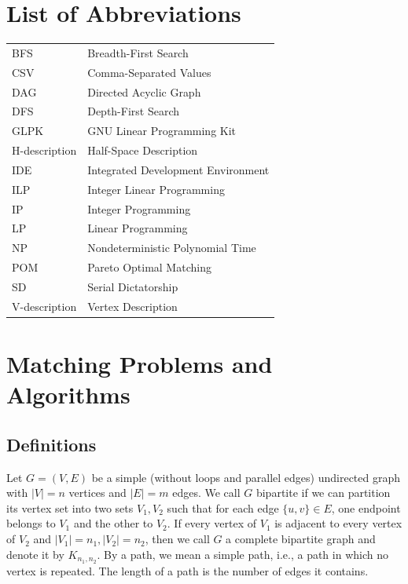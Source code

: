 \documentclass[12pt]{report}
\numberwithin{algorithm}{chapter}
\begin{document}
\chapter*{List of Abbreviations}

\begin{tabular}{ll}
	BFS            & Breadth-First Search \\
	CSV            & Comma-Separated Values \\
	DAG            & Directed Acyclic Graph \\
	DFS            & Depth-First Search \\
	GLPK           & GNU Linear Programming Kit \\
	H-description  & Half-Space Description \\
	IDE            & Integrated Development Environment \\
	ILP            & Integer Linear Programming \\
	IP             & Integer Programming \\
	LP             & Linear Programming \\
	NP             & Nondeterministic Polynomial Time \\
	POM            & Pareto Optimal Matching \\
	SD             & Serial Dictatorship \\
	V-description  & Vertex Description \\
\end{tabular}

\clearpage
{}

\chapter{Matching Problems and Algorithms}

\section{Definitions}

	Let $G = (V,E)$ be a simple (without loops and parallel edges) undirected graph with $|V| = n$ vertices and $|E| = m$ edges. We call $G$ bipartite if we can partition its vertex set into two sets $V_{1}, V_{2}$ such that for each edge $\{u,v\} \in E$, one endpoint belongs to $V_{1}$ and the other to $V_{2}$. If every vertex of $V_{1}$ is adjacent to every vertex of $V_{2}$ and $|V_{1}| = n_{1}, |V_{2}| = n_{2}$, then we call $G$ a complete bipartite graph and denote it by $K_{n_{1},n_{2}}$. By a path, we mean a simple path, i.e., a path in which no vertex is repeated. The length of a path is the number of edges it contains.
\end{document}
